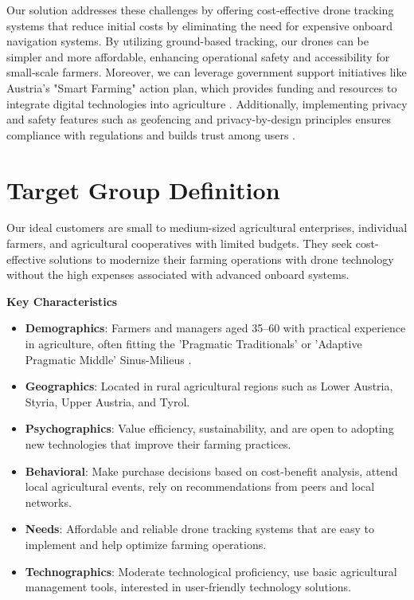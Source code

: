 Our solution addresses these challenges by offering cost-effective drone tracking systems that reduce initial costs by eliminating the need for expensive onboard navigation systems. By utilizing ground-based tracking, our drones can be simpler and more affordable, enhancing operational safety and accessibility for small-scale farmers. Moreover, we can leverage government support initiatives like Austria's "Smart Farming" action plan, which provides funding and resources to integrate digital technologies into agriculture \citep{smartfarming2023}. Additionally, implementing privacy and safety features such as geofencing and privacy-by-design principles ensures compliance with regulations and builds trust among users \citep{secure_redact_drones_privacy}.

\section{Target Group Definition}

Our ideal customers are small to medium-sized agricultural enterprises, individual farmers, and agricultural cooperatives with limited budgets. They seek cost-effective solutions to modernize their farming operations with drone technology without the high expenses associated with advanced onboard systems.

\textbf{Key Characteristics}

\begin{itemize}
	\item \textbf{Demographics}: Farmers and managers aged 35--60 with practical experience in agriculture, often fitting the 'Pragmatic Traditionals' or 'Adaptive Pragmatic Middle' Sinus-Milieus \cite{sinus_institut_2024}. 
	\item \textbf{Geographics}: Located in rural agricultural regions such as Lower Austria, Styria, Upper Austria, and Tyrol. 
	\item \textbf{Psychographics}: Value efficiency, sustainability, and are open to adopting new technologies that improve their farming practices. 
	\item \textbf{Behavioral}: Make purchase decisions based on cost-benefit analysis, attend local agricultural events, rely on recommendations from peers and local networks. 
	\item \textbf{Needs}: Affordable and reliable drone tracking systems that are easy to implement and help optimize farming operations. 
	\item \textbf{Technographics}: Moderate technological proficiency, use basic agricultural management tools, interested in user-friendly technology solutions. 
\end{itemize}

